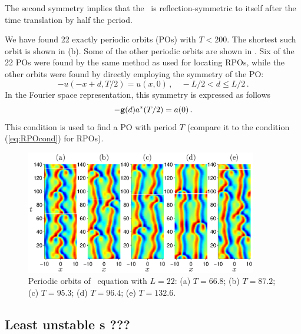 The second symmetry implies that the \rpo\ is reflection-symmetric
to itself after the time translation by half the period.

We have found 22 exactly periodic orbits (POs) with $T < 200$.  The
shortest such orbit is shown in (b).  Some
of the other periodic orbits are shown in . Six
of the 22 POs were found by the same method as used for locating
RPOs, while the other orbits were found by directly employing the
symmetry of the PO:
\[ -u(-x+d,T/2) = u(x,0)\,, \quad -L/2 < d \leq L/2\,.\]
In the Fourier space representation, this symmetry is expressed as
follows
\[
 -{\bf g}(d)a^\ast(T/2) = a(0)\,.
\]
This condition is used to find a PO with period $T$ (compare it to
the condition (\ref{eq:RPOcond}) for RPOs). 


\begin{figure}[t]
\begin{center}
\includegraphics[width=0.9\textwidth]{figs/ks22rposPO.eps}
\end{center}
\caption{Periodic orbits of \KS\ equation with $L = 22$: (a) $T =
66.8$; (b) $T = 87.2$; (c) $T = 95.3$; (d) $T = 96.4$; (e) $T =
132.6$.}\label{f:ks22rposPO}
\end{figure}


\subsection{Least unstable \rpo s ???}

